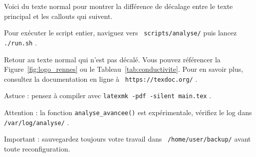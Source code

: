 \documentclass[12pt,a4paper]{report} %
\newcommand{\inlinecode}[1]{%
  \colorbox{inlineCodeBg}{%
    \lstinline[basicstyle=\ttfamily\small\color{inlineCodeText}]!#1!%
  }%
}
\newcommand{\filepath}[1]{%
  \colorbox{pathBg}{%
    \lstinline[basicstyle=\ttfamily\small\color{pathText}]!#1!%
  }%
}
\newcommand{\folderpath}[1]{%
  \colorbox{pathBg}{%
    \textcolor{folderColor}{\faFolder}\,%
    \lstinline[basicstyle=\ttfamily\small\color{pathText}]!#1!%
  }%
}
\newcommand{\urlpath}[1]{%
  \colorbox{urlBg}{%
    \textcolor{linkColor}{\faLink}\,%
    \lstinline[basicstyle=\ttfamily\small\color{urlText}]!#1!%
  }%
}
\begin{document}
Voici du texte normal pour montrer la différence de décalage entre 
le texte principal et les callouts qui suivent.

\begin{InfoBox}
Pour exécuter le script entier, naviguez vers \folderpath{scripts/analyse/} puis lancez \filepath{./run.sh}.
\end{InfoBox}

Retour au texte normal qui n'est pas décalé. Vous pouvez référencer la Figure~\ref{fig:logo_rennes} ou le Tableau~\ref{tab:conductivite}. 
Pour en savoir plus, consultez la documentation en ligne à \urlpath{https://texdoc.org/}.

\begin{TipBox}
Astuce : pensez à compiler avec \filepath{latexmk -pdf -silent main.tex}.
\end{TipBox}

\begin{WarningBox}
Attention : la fonction \inlinecode{analyse_avancee()} est expérimentale, vérifiez le log dans \folderpath{/var/log/analyse/}.
\end{WarningBox}

\begin{ImportantBox}
Important : sauvegardez toujours votre travail dans \folderpath{/home/user/backup/} avant toute reconfiguration.
\end{ImportantBox}
\end{document}
